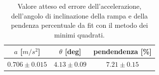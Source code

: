 \documentclass{report} \usepackage[T1]{fontenc} \usepackage[italian]{babel}
\begin{document}
\begin{table}[H]
  \renewcommand{\arraystretch}{1.5}
  \centering
  \begin{tabular}{ | c | c | c | }
    \hline
    $a$ [$m/s^2$] &  $\theta$ [deg] & pendendenza [\%] \\
    \hline
    $0.706\pm0.015$ & $4.13\pm0.09$ & $7.21\pm0.15$ \\
    \hline
  \end{tabular}
  \caption{Valore atteso ed errore dell'accelerazione, dell'angolo di inclinazione della rampa
           e della pendenza percentuale da fit con il metodo dei minimi quadrati.}
  \label{tab:fit_bike}
\end{table}

{}

\end{document}
